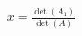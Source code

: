 \documentclass[preview]{standalone}
\begin{document}
\begin{align*}
x = \frac{\det(A_1)}{\det(A)}
\end{align*}
\end{document}

